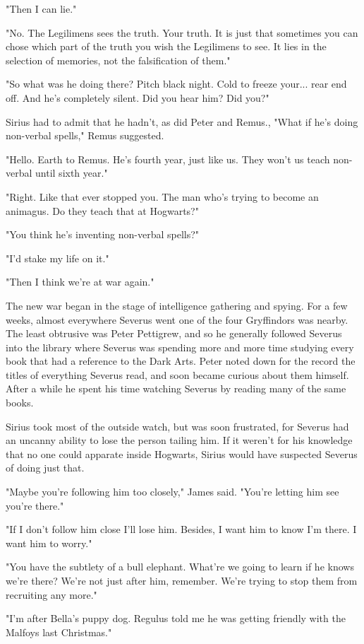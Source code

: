 \documentclass[a4paper,11pt]{article}
\begin{document}
"Then I can lie."

"No. The Legilimens sees the truth. Your truth. It is just that sometimes you can chose which part of the truth you wish the Legilimens to see. It lies in the selection of memories, not the falsification of them."

"So what was he doing there? Pitch black night. Cold to freeze your... rear end off. And he's completely silent. Did you hear him? Did you?"

Sirius had to admit that he hadn't, as did Peter and Remus., "What if he's doing non-verbal spells," Remus suggested.

"Hello. Earth to Remus. He's fourth year, just like us. They won't us teach non-verbal until sixth year."

"Right. Like that ever stopped you. The man who's trying to become an animagus. Do they teach that at Hogwarts?"

"You think he's inventing non-verbal spells?"

"I'd stake my life on it."

"Then I think we're at war again."

The new war began in the stage of intelligence gathering and spying. For a few weeks, almost everywhere Severus went one of the four Gryffindors was nearby. The least obtrusive was Peter Pettigrew, and so he generally followed Severus into the library where Severus was spending more and more time studying every book that had a reference to the Dark Arts. Peter noted down for the record the titles of everything Severus read, and soon became curious about them himself. After a while he spent his time watching Severus by reading many of the same books.

Sirius took most of the outside watch, but was soon frustrated, for Severus had an uncanny ability to lose the person tailing him. If it weren't for his knowledge that no one could apparate inside Hogwarts, Sirius would have suspected Severus of doing just that.

"Maybe you're following him too closely," James said. "You're letting him see you're there."

"If I don't follow him close I'll lose him. Besides, I want him to know I'm there. I want him to worry."

"You have the subtlety of a bull elephant. What're we going to learn if he knows we're there? We're not just after him, remember. We're trying to stop them from recruiting any more."

"I'm after Bella's puppy dog. Regulus told me he was getting friendly with the Malfoys last Christmas."
\end{document}

